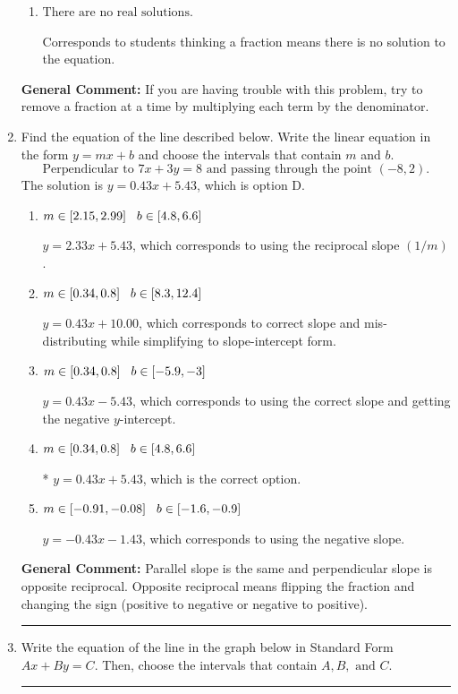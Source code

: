 \documentclass{extbook}[14pt]
\newcommand{\litem}[1]{\item #1

\rule{\textwidth}{0.4pt}}
\begin{document}
\begin{enumerate}
{\begin{enumerate}[label=\Alph*.]
* $x = -2.333$, which is the correct option.
\item \( \text{There are no real solutions.} \)

Corresponds to students thinking a fraction means there is no solution to the equation.
\end{enumerate}

\textbf{General Comment:} If you are having trouble with this problem, try to remove a fraction at a time by multiplying each term by the denominator.
}
\litem{
Find the equation of the line described below. Write the linear equation in the form $ y=mx+b $ and choose the intervals that contain $m$ and $b$.
\[ \text{Perpendicular to } 7 x + 3 y = 8 \text{ and passing through the point } (-8, 2). \]The solution is \( y = 0.43x + 5.43 \), which is option D.\begin{enumerate}[label=\Alph*.]
\item \( m \in [2.15, 2.99] \hspace*{3mm} b \in [4.8, 6.6] \)

 $y = 2.33x + 5.43$, which corresponds to using the reciprocal slope $(1/m)$.
\item \( m \in [0.34, 0.8] \hspace*{3mm} b \in [8.3, 12.4] \)

 $y = 0.43x + 10.00$, which corresponds to correct slope and mis-distributing while simplifying to slope-intercept form.
\item \( m \in [0.34, 0.8] \hspace*{3mm} b \in [-5.9, -3] \)

 $y = 0.43x - 5.43$, which corresponds to using the correct slope and getting the negative $y$-intercept.
\item \( m \in [0.34, 0.8] \hspace*{3mm} b \in [4.8, 6.6] \)

* $y = 0.43x + 5.43$, which is the correct option.
\item \( m \in [-0.91, -0.08] \hspace*{3mm} b \in [-1.6, -0.9] \)

 $y = -0.43x - 1.43$, which corresponds to using the negative slope.
\end{enumerate}

\textbf{General Comment:} Parallel slope is the same and perpendicular slope is opposite reciprocal. Opposite reciprocal means flipping the fraction and changing the sign (positive to negative or negative to positive).
}
\litem{
Write the equation of the line in the graph below in Standard Form $Ax+By=C$. Then, choose the intervals that contain $A, B, \text{ and } C$.

}
\end{enumerate}
\end{document}
